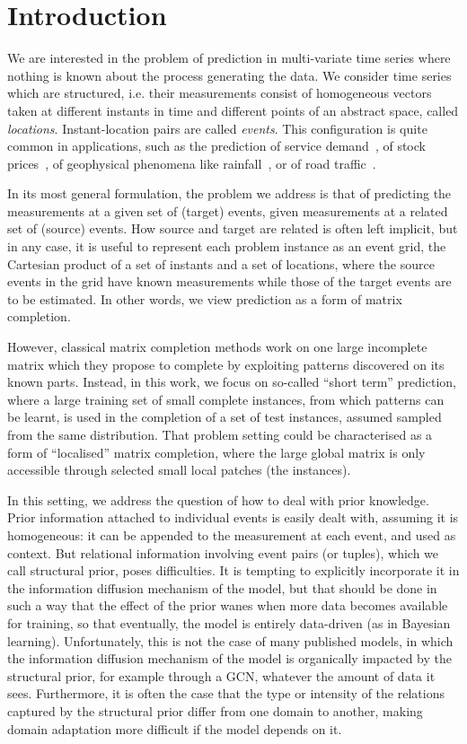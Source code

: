 \documentclass[a4paper]{article}
\begin{document}
\section{Introduction}
We are interested in the problem of prediction in multi-variate time series where nothing is known about the process generating the data. We consider time series which are structured, i.e. their measurements consist of homogeneous vectors taken at different instants in time and different points of an abstract space, called {\em locations}. Instant-location pairs are called {\em events}. This configuration is quite common in applications, such as the prediction of service demand~\cite{salinas_high-dimensional_2019}, of stock prices~\cite{elliot_time_2017}, of geophysical phenomena like rainfall~\cite{shi_convolutional_2015}, or of road traffic~\cite{li_diffusion_2017}.

In its most general formulation, the problem we address is that of predicting the measurements at a given set of (target) events, given measurements at a related set of (source) events. How source and target are related is often left implicit, but in any case, it is useful to represent each problem instance as an event grid, the Cartesian product of a set of instants and a set of locations, where the source events in the grid have known measurements while those of the target events are to be estimated. In other words, we view prediction as a form of matrix completion.

However, classical matrix completion methods work on one large incomplete matrix which they propose to complete by exploiting patterns discovered on its known parts. Instead, in this work, we focus on so-called ``short term'' prediction, where a large training set of small complete instances, from which patterns can be learnt, is used in the completion of a set of test instances, assumed sampled from the same distribution. That problem setting could be characterised as a form of ``localised'' matrix completion, where the large global matrix is only accessible through selected small local patches (the instances).

In this setting, we address the question of how to deal with prior knowledge. Prior information attached to individual events is easily dealt with, assuming it is homogeneous: it can be appended to the measurement at each event, and used as context. But relational information involving event pairs (or tuples), which we call structural prior, poses difficulties. It is tempting to explicitly incorporate it in the information diffusion mechanism of the model, but that should be done in such a way that the effect of the prior wanes when more data becomes available for training, so that eventually, the model is entirely data-driven (as in Bayesian learning). Unfortunately, this is not the case of many published models, in which the information diffusion mechanism of the model is organically impacted by the structural prior, for example through a GCN, whatever the amount of data it sees. Furthermore, it is often the case that the type or intensity of the relations captured by the structural prior differ from one domain to another, making domain adaptation more difficult if the model depends on it.
\end{document}

